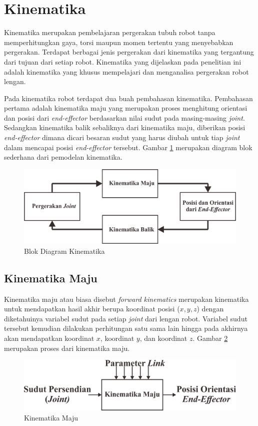 \section{Kinematika}
Kinematika merupakan pembelajaran pergerakan tubuh robot tanpa memperhitungkan gaya, torsi maupun momen tertentu yang menyebabkan pergerakan. Terdapat berbagai jenis pergerakan dari kinematika yang tergantung dari tujuan dari setiap robot. Kinematika yang dijelaskan pada penelitian ini adalah kinematika yang khusus mempelajari dan menganalisa pergerakan robot lengan.  

Pada kinematika robot terdapat dua buah pembahasan kinematika. Pembahasan pertama adalah kinematika maju yang merupakan proses menghitung orientasi dan posisi dari\textit{ end-effector} berdasarkan nilai sudut pada masing-masing \textit{joint}.  Sedangkan kinematika balik sebaliknya dari kinematika maju, diberikan posisi \textit{end-effector} dimana dicari  besaran sudut yang harus diubah untuk tiap \textit{joint} dalam mencapai posisi \textit{end-effector} tersebut\cite{beni}. Gambar \ref{pic.diagram.kinematika} merupakan diagram blok sederhana dari pemodelan kinematika.
	\begin{figure}[H]
	\centering
	\includegraphics[width=12cm]{gambar/kinematika_diagram.png}
	\caption{Blok Diagram Kinematika}
	\label{pic.diagram.kinematika}
\end{figure}

\subsection{Kinematika Maju}
Kinematika maju atau biasa disebut \textit{forward kinematics} merupakan kinematika untuk mendapatkan hasil akhir berupa koordinat posisi ($x, y, z$) dengan diketahuinya variabel sudut pada setiap \textit{joint} dari lengan robot.  Variabel sudut tersebut kemudian dilakukan perhitungan satu sama lain hingga pada akhirnya akan mendapatkan koordinat $x$, koordinat $y$, dan koordinat $z$\cite{alasar}. Gambar \ref{pic.kinematikamaju} merupakan proses dari kinematika maju.
	\begin{figure}[H]
	\centering
	\includegraphics[width=12cm]{gambar/Kinematika_maju.png}
	\caption{Kinematika Maju}
	\label{pic.kinematikamaju}
\end{figure}



